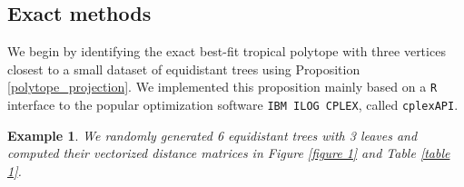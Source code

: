 \documentclass[12pt]{extarticle}
\numberwithin{theorem}{section}
\newtheorem{example}[theorem]{Example}
\begin{document}
\subsection{Exact methods}

We begin by identifying the exact best-fit tropical polytope with three vertices closest to a small dataset of equidistant trees using Proposition \ref{polytope_projection}. We implemented this proposition mainly based on a {\tt R} interface to the popular optimization software {\tt IBM ILOG CPLEX}, called {\tt cplexAPI}.

\begin{example}\label{polytope_example}
We randomly generated 6 equidistant trees with 3 leaves and computed their vectorized distance matrices in Figure \ref{figure 1} and Table \ref{table 1}. 

\begin{figure}[!ht]
\begin{floatrow}
\end{floatrow}
\end{figure}

\begin{figure}[!ht]
\begin{floatrow}
\end{floatrow}
\end{figure}


\end{example}
\end{document}
